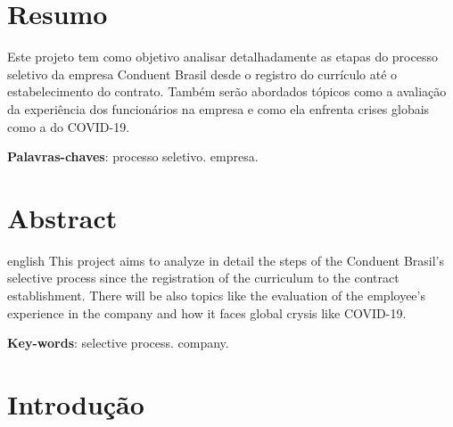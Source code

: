 \documentclass[12pt]{article}
\begin{document}
\tableofcontents


\newpage

\section*{Resumo}





\begin{resumo}

Este projeto tem como objetivo analisar detalhadamente as etapas do processo seletivo da empresa Conduent Brasil desde o registro do currículo até o estabelecimento do contrato. Também serão abordados tópicos como a avaliação da experiência dos funcionários na empresa e como ela enfrenta crises globais como a do COVID-19.

\textbf
{Palavras-chaves}: processo seletivo. empresa.
\end{resumo}

\newpage


\section*{Abstract}

\begin{Abstract}

 \begin{otherlanguage*}{english}
  This project aims to analyze in detail the steps of the Conduent Brasil's selective process since the registration of the curriculum to the contract establishment. There will be also topics like the evaluation of the employee's experience in the company and how it faces global crysis like COVID-19.

   \vspace{\onelineskip}
 
   \noindent 
   \textbf{Key-words}: selective process. company.
 \end{otherlanguage*}
\end{Abstract}

\newpage


\section{Introdução}
\end{document}

